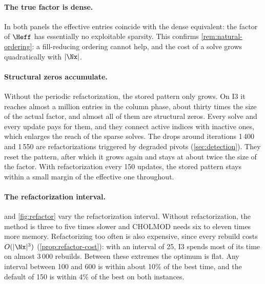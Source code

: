 \paragraph{The true factor is dense.} In both panels the effective entries coincide with the
dense equivalent: the factor of $\Heff$ has essentially no exploitable sparsity. This
confirms \cref{rem:natural-ordering}: a fill-reducing ordering cannot help, and the cost of
a solve grows quadratically with $|\Nx|$.

\paragraph{Structural zeros accumulate.} Without the periodic refactorization, the stored
pattern only grows. On I3 it reaches almost a million entries in the column phase, about
thirty times the size of the actual factor, and almost all of them are structural zeros.
Every solve and every update pays for them, and they connect active indices with inactive
ones, which enlarges the reach of the sparse solves. The drops around iterations 1\,400 and
1\,550 are refactorizations triggered by degraded pivots (\cref{sec:detection}). They reset the
pattern, after which it grows again and stays at about twice the size of the factor. With
refactorization every 150 updates, the stored pattern stays within a small margin of the
effective one throughout.

\paragraph{The refactorization interval.}  and \cref{fig:refactor} vary the
refactorization interval. Without refactorization, the method is three to five times slower
and CHOLMOD needs six to eleven times more memory. Refactorizing too often is also expensive,
since every rebuild costs $O(|\Nx|^3)$ (\cref{prop:refactor-cost}): with an interval of 25, I3
spends most of its time on almost 3\,000 rebuilds. Between these extremes the optimum is flat.
Any interval between 100 and 600 is within about 10\% of the best time, and the default of 150
is within 4\% of the best on both instances.

\begin{table}[ht]
\centering
\small
\renewcommand{\arraystretch}{1.15}
\caption{Effect of the refactorization interval (equality variants). ``reach$/|\Nx|$'' is the
average number of rows touched by a sparse solve per nullspace column. ``never'' still
refactorizes when a pivot degrades. These runs form a separate series (times are the faster
of two runs), so the times for $\tau = 150$ differ slightly from \cref{tab:comparison-eq}.}
\label{tab:refactor}
\end{table}

